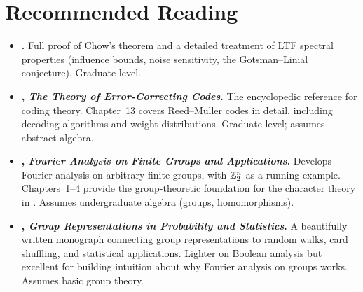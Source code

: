\section*{Recommended Reading}

\begin{itemize}
  \item \textbf{\citet[Chapter~5]{odonnell2014analysis}.}
    Full proof of Chow's theorem and a detailed treatment of LTF
    spectral properties (influence bounds, noise sensitivity, the
    Gotsman--Linial conjecture). Graduate level.

  \item \textbf{\citet{macwilliams1977theory}, \emph{The Theory of
    Error-Correcting Codes}.}
    The encyclopedic reference for coding theory. Chapter~13 covers
    Reed--Muller codes in detail, including decoding algorithms and
    weight distributions. Graduate level; assumes abstract algebra.

  \item \textbf{\citet{terras1999fourier}, \emph{Fourier Analysis on
    Finite Groups and Applications}.}
    Develops Fourier analysis on arbitrary finite groups, with $\mathbb{Z}_2^n$
    as a running example. Chapters~1--4 provide the group-theoretic
    foundation for the character theory in .
    Assumes undergraduate algebra (groups, homomorphisms).

  \item \textbf{\citet{diaconis1988group}, \emph{Group Representations
    in Probability and Statistics}.}
    A beautifully written monograph connecting group representations to
    random walks, card shuffling, and statistical applications. Lighter
    on Boolean analysis but excellent for building intuition about why
    Fourier analysis on groups works. Assumes basic group theory.
\end{itemize}
